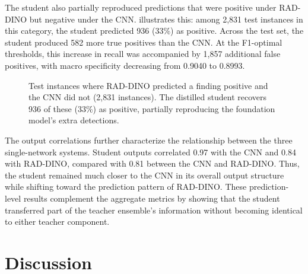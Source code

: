 \documentclass[conference]{IEEEtran}
\begin{document}
The student also partially reproduced predictions that were positive under RAD-DINO but negative under the CNN.  illustrates this: among 2,831 test instances in this category, the student predicted 936 (33\%) as positive. Across the test set, the student produced 582 more true positives than the CNN. At the F1-optimal thresholds, this increase in recall was accompanied by 1,857 additional false positives, with macro specificity decreasing from 0.9040 to 0.8993.

\begin{figure}[t]
\centering
{}
\caption{Test instances where RAD-DINO predicted a finding positive and the CNN did not (2,831 instances). The distilled student recovers 936 of these (33\%) as positive, partially reproducing the foundation model's extra detections.}
\label{fig:overlap}
\end{figure}

The output correlations further characterize the relationship between the three single-network systems. Student outputs correlated 0.97 with the CNN and 0.84 with RAD-DINO, compared with 0.81 between the CNN and RAD-DINO. Thus, the student remained much closer to the CNN in its overall output structure while shifting toward the prediction pattern of RAD-DINO. These prediction-level results complement the aggregate metrics by showing that the student transferred part of the teacher ensemble's information without becoming identical to either teacher component.

\section{Discussion}
\label{sec:discussion}
\end{document}
